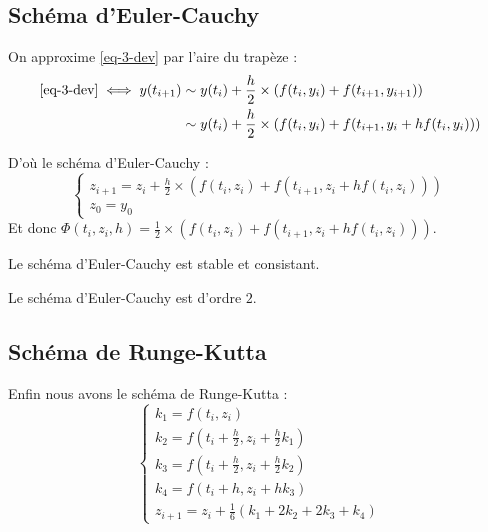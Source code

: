 	\subsection{Schéma d'Euler-Cauchy}

		On approxime \eqref{eq-3-dev} par l'aire du trapèze :
		\begin{align*}
			\eqref{eq-3-dev} \iff
			y(t_{i+1}) 	&\sim y(t_i) + \frac{h}{2}\times \left( f(t_i, y_i) + f(t_{i+1}, y_{i+1}) \right)	\\
						&\sim y(t_i) + \frac{h}{2}\times \left( f(t_i, y_i) + f(t_{i+1}, y_i + hf(t_i,y_i)) \right)
		\end{align*}

		D'où le schéma d'Euler-Cauchy :
		\begin{equation}
			\label{eq-3-eulerCauchy}
			\begin{cases}
				z_{i+1} = z_i + \frac{h}{2}\times \left( f(t_i, z_i) + f(t_{i+1}, z_i + hf(t_i,z_i)) \right)	\\
				z_0 = y_0
			\end{cases}
		\end{equation}
		Et donc $\Phi(t_i,z_i,h) = \frac{1}{2}\times \left( f(t_i, z_i) + f(t_{i+1}, z_i + hf(t_i,z_i)) \right)$.

		\bigskip

		\begin{propShort}
			Le schéma d'Euler-Cauchy est stable et consistant.
		\end{propShort}

		\begin{propShort}
			Le schéma d'Euler-Cauchy est d'ordre $2$.
		\end{propShort}


	\subsection{Schéma de Runge-Kutta}

		Enfin nous avons le schéma de Runge-Kutta :
		\begin{equation}
			\label{eq-3-rungeKutta}
			\begin{cases}
				k_1 = f(t_i, z_i)	\\
				k_2 = f(t_i + \frac{h}{2}, 	z_i + \frac{h}{2}k_1)	\\
				k_3 = f(t_i + \frac{h}{2}, 	z_i + \frac{h}{2}k_2)	\\
				k_4 = f(t_i + h,			z_i + hk_3)				\\
				z_{i+1} = z_i + \frac{1}{6}(k_1 + 2k_2 + 2k_3 + k_4)
			\end{cases}
		\end{equation}

